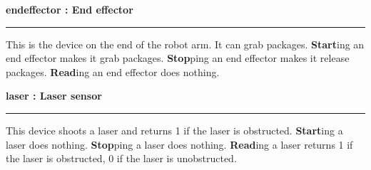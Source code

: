 \documentclass[12pt,a4paper]{article}
\begin{document}
\pagebreak

\Huge\bfseries endeffector : \large End effector\par
\noindent\rule{ \textwidth }{2pt}\par
\vspace{ 0.5cm }
\mdseries\normalsize This is the device on the end of the robot arm. It can grab packages. \textbf{Start}ing an end effector makes it grab packages. \textbf{Stop}ping an end effector makes it release packages. \textbf{Read}ing an end effector does nothing.

\pagebreak

\Huge\bfseries laser : \large Laser sensor\par
\noindent\rule{ \textwidth }{2pt}\par
\vspace{ 0.5cm }
\mdseries\normalsize This device shoots a laser and returns 1 if the laser is obstructed. \textbf{Start}ing a laser does nothing. \textbf{Stop}ping a laser does nothing. \textbf{Read}ing a laser returns 1 if the laser is obstructed, 0 if the laser is unobstructed.

\pagebreak
\end{document}
